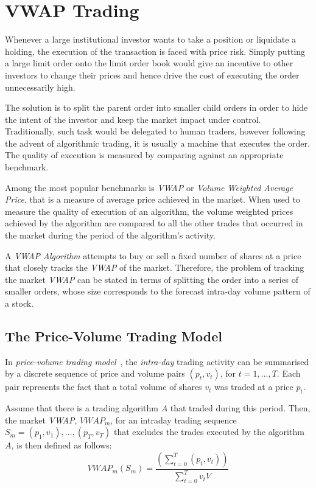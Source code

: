 \section{VWAP Trading}
Whenever a large institutional investor wants to take a position or liquidate a holding, the execution of the transaction is faced with price risk. Simply putting a large limit order onto the limit order book would give an incentive to other investors to change their prices and hence drive the cost of executing the order unnecessarily high. 

The solution is to split the parent order into smaller child orders in order to hide the intent of the investor and keep the market impact under control. Traditionally, such task would be delegated to human traders, however following the advent of algorithmic trading, it is usually a machine that executes the order. The quality of execution is measured by comparing against an appropriate benchmark.

Among the most popular benchmarks is \textit{VWAP} or \textit{Volume Weighted Average Price}, that is a measure of average price achieved in the market. When used to measure the quality of execution of an algorithm, the volume weighted prices achieved by the algorithm are compared to all the  other trades that occurred in the market during the period of the algorithm's activity. 

A \textit{VWAP Algorithm} attempts to buy or sell a fixed number of shares at a price that closely tracks the \textit{VWAP} of the market. Therefore, the problem of tracking the market \textit{VWAP} can be stated in terms of splitting the order into a series of smaller orders, whose size corresponds to the forecast intra-day volume pattern of a stock. 

\subsection{The Price-Volume Trading Model}
In \textit{price-volume trading model}~\cite{Kakade2004}, the \textit{intra-day} trading activity can be summarised by a discrete sequence of price and volume pairs $(p_t, v_t)$, for $t=1,\ldots,T$. Each pair represents the fact that a total volume of shares $v_t$ was traded at a price $p_t$. 

Assume that there is a trading algorithm $A$ that traded during this period.  Then, the market \textit{VWAP}, $VWAP_m$, for an intraday trading sequence $S_m = (p_1, v_1), \ldots, (p_T, v_T)$ that excludes the trades executed by the algorithm $A$, is then defined as follows:
\begin{equation}  
\label{Equation/Market-Vwap}
VWAP_m(S_m) = \frac{\left( \displaystyle\sum\limits_{t=0}^T (p_t, v_t) \right)}{\displaystyle\sum\limits_{t=0}^T v_tV}
\end{equation}

